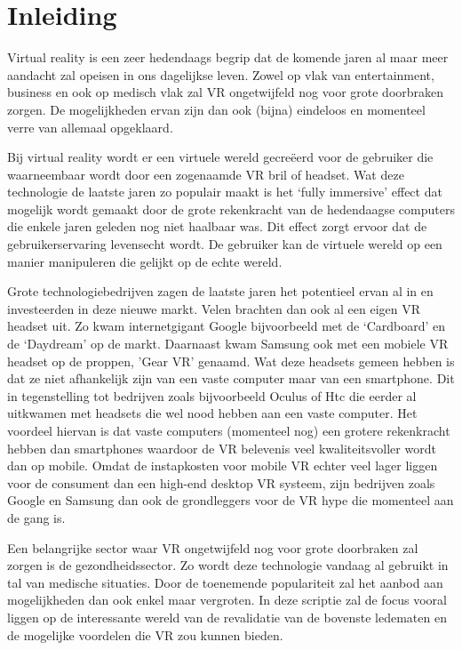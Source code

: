
\chapter{Inleiding}
\label{ch:inleiding}

Virtual reality is een zeer hedendaags begrip dat de komende jaren al maar meer aandacht zal opeisen in ons dagelijkse leven. Zowel op vlak van entertainment, business en ook op medisch vlak zal VR ongetwijfeld nog voor grote doorbraken zorgen. De mogelijkheden ervan zijn dan ook (bijna) eindeloos en momenteel verre van allemaal opgeklaard.

Bij virtual reality wordt er een virtuele wereld gecreëerd voor de gebruiker die waarneembaar wordt door een zogenaamde VR bril of headset. Wat deze technologie de laatste jaren zo populair maakt is het ‘fully immersive’ effect dat mogelijk wordt gemaakt door de grote rekenkracht van de hedendaagse computers die enkele jaren geleden nog niet haalbaar was. Dit effect zorgt ervoor dat de gebruikerservaring levensecht wordt. De gebruiker kan de virtuele wereld op een manier manipuleren die gelijkt op de echte wereld. 

Grote technologiebedrijven zagen de laatste jaren het potentieel ervan al in en investeerden in deze nieuwe markt. Velen brachten dan ook al een eigen VR headset uit. Zo kwam internetgigant Google bijvoorbeeld met de ‘Cardboard’ en de ‘Daydream’ op de markt. Daarnaast kwam Samsung ook met een mobiele VR headset op de proppen, 'Gear VR’ genaamd. Wat deze headsets gemeen hebben is dat ze niet afhankelijk zijn van een vaste computer maar van een smartphone. Dit in tegenstelling tot bedrijven zoals bijvoorbeeld Oculus of Htc die eerder al uitkwamen met headsets die wel nood hebben aan een vaste computer. Het voordeel hiervan is dat vaste computers (momenteel nog) een grotere rekenkracht hebben dan smartphones waardoor de VR belevenis veel kwaliteitsvoller wordt dan op mobile. Omdat de instapkosten voor mobile VR echter veel lager liggen voor de consument dan een high-end desktop VR systeem, zijn bedrijven zoals Google en Samsung dan ook de grondleggers voor de VR hype die momenteel aan de gang is.


Een belangrijke sector waar VR ongetwijfeld nog voor grote doorbraken zal zorgen is de gezondheidssector. Zo wordt deze technologie vandaag al gebruikt in tal van medische situaties. Door de toenemende populariteit zal het aanbod aan mogelijkheden dan ook enkel maar vergroten. In deze scriptie zal de focus vooral liggen op de interessante wereld van de revalidatie van de bovenste ledematen en de mogelijke voordelen die VR zou kunnen bieden.


